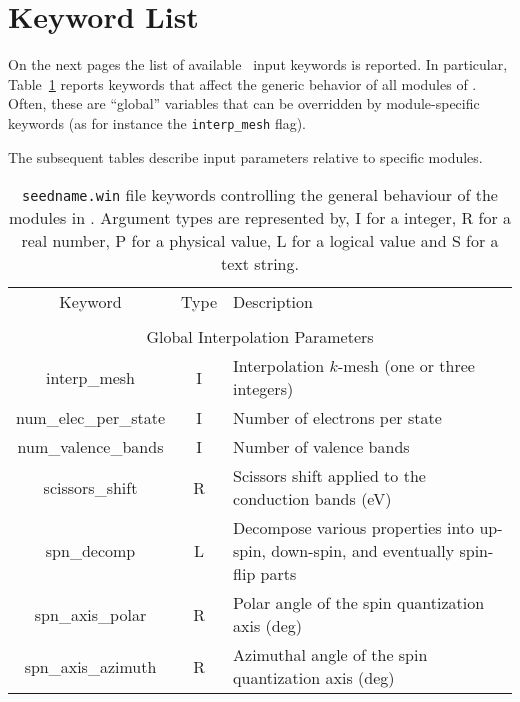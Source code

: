 \section{Keyword List}
On the next pages the list of available
\postw\ input keywords is reported.
In particular, Table~\ref{parameter_keywords_postw90} reports keywords
that affect the generic behavior of all modules of
\postw. Often, these are ``global'' variables that can be overridden
by module-specific keywords (as for instance the {\tt interp\_mesh} flag).

The subsequent tables describe input parameters relative to specific modules.

\clearpage

\begin{table}[hH!]
\begin{center}
\begin{tabular}{|c|c|p{6cm}|}
  \hline
  Keyword & Type & Description \\
  &      &             \\
  \hline\hline
  \multicolumn{3}{|c|}{Global Interpolation Parameters} \\
  \hline
  {\sc interp\_mesh}   & I & Interpolation $k$-mesh (one or three integers) \\
  {\sc num\_elec\_per\_state}   & I & Number of electrons per state \\
  {\sc num\_valence\_bands}   & I & Number of valence bands \\
  {\sc scissors\_shift}   & R & Scissors shift applied to the conduction bands (eV) \\
  {\sc spn\_decomp}& L & Decompose various properties into
  up-spin, down-spin, and eventually spin-flip parts\\
  {\sc spn\_axis\_polar}& R & Polar angle of the spin quantization axis (deg)\\
  {\sc spn\_axis\_azimuth}& R & Azimuthal angle of the spin quantization axis (deg)\\
  \hline
\end{tabular}
\caption[Parameter file keywords controlling \postw.]
{{\tt seedname.win} file keywords controlling the general behaviour of
  the modules in \postw. Argument types
are represented by, I for a integer, R for a real number, P for a
physical value, L for a logical value and S for a text string.}
\label{parameter_keywords_postw90}
\end{center}
\end{table}


